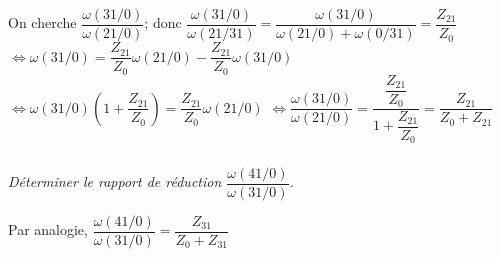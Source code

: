 \documentclass[10pt,fleqn]{article} %
\begin{document}
\begin{multicols}{2}
\begin{multicols}{2}
\begin{corrige}
On cherche 
$\dfrac{\omega(31/0)}{\omega(21/0)}$; donc $\dfrac{\omega(31/0)}{\omega(21/31)}=\dfrac{\omega(31/0)}{\omega(21/0)+\omega(0/31)}=\dfrac{Z_{21}}{Z_0}$
$\Leftrightarrow \omega(31/0)=\dfrac{Z_{21}}{Z_0}\omega(21/0)-\dfrac{Z_{21}}{Z_0}\omega(31/0)$
$\Leftrightarrow \omega(31/0)\left(1+\dfrac{Z_{21}}{Z_0}\right)=\dfrac{Z_{21}}{Z_0}\omega(21/0)$
$\Leftrightarrow \dfrac{\omega(31/0)}{\omega(21/0)}=\dfrac{\dfrac{Z_{21}}{Z_0}}{1+\dfrac{Z_{21}}{Z_0}}=\dfrac{Z_{21}}{Z_{0}+Z_{21}}$
\end{corrige}
\else
\fi

\subparagraph{}
\textit{Déterminer le rapport de réduction $\dfrac{\omega(41/0)}{\omega(31/0)}$.}
\ifprof
\begin{corrige}
Par analogie, 
$\dfrac{\omega(41/0)}{\omega(31/0)}=\dfrac{Z_{31}}{Z_{0}+Z_{31}}$
\end{corrige}
\else
\fi



\end{multicols}
\end{multicols}
\end{document}
